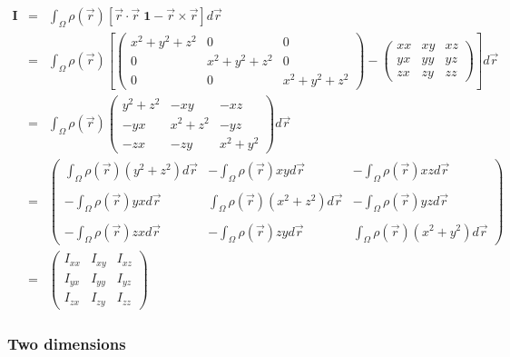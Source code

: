 \begin{eqnarray}
\bm I
&=&\int_\Omega \rho(\vec r) [\vec r\cdot\vec r \; \bm 1 - \vec r \times \vec r  ] d\vec r \\
&=&\int_\Omega \rho(\vec r) 
\left[
\left(
\begin{array}{ccc}
x^2+y^2+z^2 & 0 & 0 \\
0 & x^2+y^2+z^2 & 0 \\
0 & 0 & x^2+y^2+z^2
\end{array}
\right)
- 
\left(
\begin{array}{ccc}
xx & xy & xz \\
yx & yy & yz \\
zx & zy & zz 
\end{array}
\right)
\right] 
d\vec r \\
&=&\int_\Omega \rho(\vec r) 
\left(
\begin{array}{ccc}
y^2+z^2 & -xy & -xz \\
-yx & x^2+z^2 & -yz \\
-zx & -zy & x^2+y^2 
\end{array}
\right)
d\vec r \\
&=&
\left(
\begin{array}{ccc}
\int_\Omega \rho(\vec r) (y^2+z^2) d\vec r & 
-\int_\Omega \rho(\vec r) xy d\vec r & 
-\int_\Omega \rho(\vec r) xz d\vec r \\\\
-\int_\Omega \rho(\vec r) yx d\vec r & 
\int_\Omega \rho(\vec r) (x^2+z^2) d\vec r & 
-\int_\Omega \rho(\vec r) yz d\vec r \\\\
-\int_\Omega \rho(\vec r) zx d\vec r & 
-\int_\Omega \rho(\vec r) zy d\vec r & 
\int_\Omega \rho(\vec r) (x^2+y^2) d\vec r 
\end{array}
\right)\\
&=&
\left(
\begin{array}{ccc}
I_{xx} & I_{xy} & I_{xz} \\
I_{yx} & I_{yy} & I_{yz} \\
I_{zx} & I_{zy} & I_{zz} 
\end{array}
\right)
\end{eqnarray}


\subsubsection{Two dimensions}

